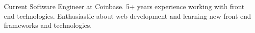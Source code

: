 

\begin{cvparagraph}

Current Software Engineer at Coinbase. 5+ years experience working with front end technologies. Enthusiastic about web development and learning new front end frameworks and technologies.  
\end{cvparagraph}

